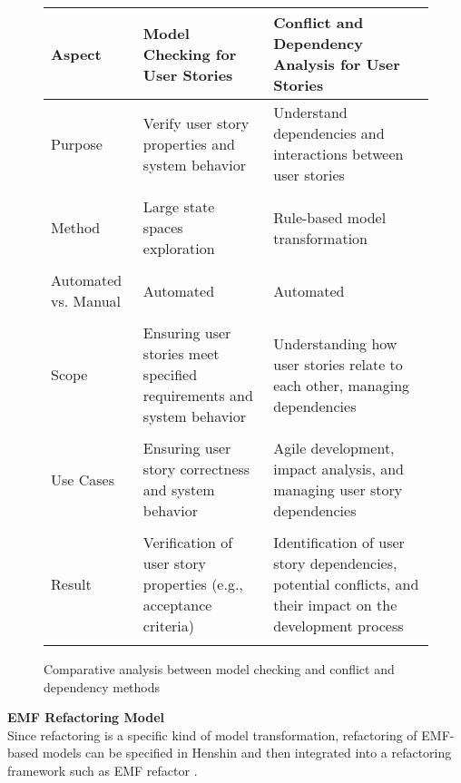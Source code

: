 \begin{figure}
\begingroup
\footnotesize
\centering
\begin{tabularx}{\textwidth}{l  X  X}
\hline
Aspect	&Model Checking for User Stories &	Conflict and Dependency Analysis for User Stories \\
\hline\hline
Purpose	&Verify user story properties and system behavior	&Understand dependencies and interactions between user stories \\\\ 
Method&	Large state spaces exploration&	Rule-based model transformation\\\\ 
Automated vs. Manual&	Automated	&Automated\\\\ 
Scope&	Ensuring user stories meet specified requirements and system behavior	&Understanding how user stories relate to each other, managing dependencies\\\\ 
Use Cases&	Ensuring user story correctness and system behavior	&Agile development, impact analysis, and managing user story dependencies\\\\ 
Result	&Verification of user story properties (e.g., acceptance criteria)	&Identification of user story dependencies, potential conflicts, and their impact on the development process\\\\ 
\hline
\end{tabularx}
\begin{TableCaption}
\caption{Comparative analysis between model checking and conflict and dependency methods}\label{tb:sec_6_comparative_analysis}
\end{TableCaption}
\endgroup
\end{figure}
\textbf{EMF Refactoring Model}\\ 
Since refactoring is a specific kind of model transformation, refactoring of EMF-based models can be specified in Henshin and then integrated into a refactoring framework such as EMF refactor \cite{arendt2013tool}.
